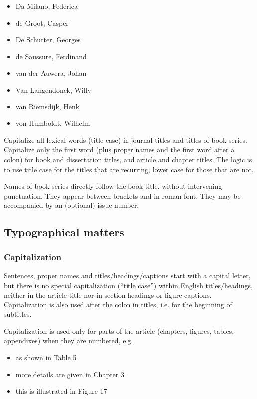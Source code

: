 \documentclass[charis,linguex]{glossa}
\begin{document}
\begin{itemize}
\item Da Milano, Federica
\item de Groot, Casper
\item De Schutter, Georges
\item de Saussure, Ferdinand
\item van der Auwera, Johan
\item Van Langendonck, Willy
\item van Riemsdijk, Henk
\item von Humboldt, Wilhelm
\end{itemize}

Capitalize all lexical words (title case) in journal titles and titles of book series. Capitalize only the first word (plus proper names and the first word after a colon) for book and dissertation titles, and article and chapter titles. The logic is to use title case for the titles that are recurring, lower case for those that are not.

Names of book series directly follow the book title, without intervening punctuation. They appear between brackets and in roman font. They may be accompanied by an (optional) issue number.

\subsection{Typographical matters}

\subsubsection{Capitalization}

Sentences, proper names and titles/headings/captions start with a capital letter, but there is no special capitalization (“title case”) within English titles/headings, neither in the article title nor in section headings or figure captions. Capitalization is also used after the colon in titles, i.e. for the beginning of subtitles.

Capitalization is used only for parts of the article (chapters, figures, tables, appendixes) when they are numbered, e.g.
\begin{itemize}
\item as shown in Table 5
\item more details are given in Chapter 3
\item this is illustrated in Figure 17
\end{itemize}
\end{document}
